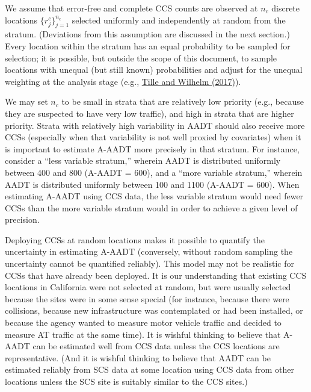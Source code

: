 \documentclass[11pt]{article}
\begin{document}
We assume that error-free and complete CCS counts are observed at
\(n_c\) discrete locations \(\{r_j^c\}_{j=1}^{n_c}\) selected uniformly
and independently at random from the stratum. (Deviations from this
assumption are discussed in the next section.) Every location within the
stratum has an equal probability to be sampled for selection; it is
possible, but outside the scope of this document, to sample locations
with unequal (but still known) probabilities and adjust for the unequal
weighting at the analysis stage (e.g.,
\href{https://projecteuclid.org/journals/statistical-science/volume-32/issue-2/Probability-Sampling-Designs--Principles-for-Choice-of-Design-and/10.1214/16-STS606.full}{Tille
and Wilhelm (2017)}).

We may set \(n_c\) to be small in strata that are relatively low
priority (e.g., because they are suspected to have very low traffic),
and high in strata that are higher priority. Strata with relatively high
variability in AADT should also receive more CCSs (especially when that
variability is not well proxied by covariates) when it is important to
estimate A-AADT more precisely in that stratum. For instance, consider a
``less variable stratum,'' wherein AADT is distributed uniformly between
400 and 800 (A-AADT = 600), and a ``more variable stratum,'' wherein
AADT is distributed uniformly between 100 and 1100 (A-AADT = 600). When
estimating A-AADT using CCS data, the less variable stratum would need
fewer CCSs than the more variable stratum would in order to achieve a
given level of precision.

Deploying CCSs at random locations makes it possible to quantify the
uncertainty in estimating A-AADT (conversely, without random sampling
the uncertainty cannot be quantified reliably). This model may not be
realistic for CCSs that have already been deployed. It is our
understanding that existing CCS locations in California were not
selected at random, but were usually selected because the sites were in
some sense special (for instance, because there were collisions, because
new infrastructure was contemplated or had been installed, or because
the agency wanted to measure motor vehicle traffic and decided to
measure AT traffic at the same time). It is wishful thinking to believe
that A-AADT can be estimated well from CCS data unless the CCS locations
are representative. (And it is wishful thinking to believe that AADT can
be estimated reliably from SCS data at some location using CCS data from
other locations unless the SCS site is suitably similar to the CCS
sites.)
\end{document}

